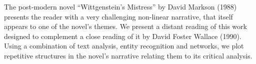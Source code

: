 The post-modern novel ``Wittgenstein's Mistress'' by David Markson (1988) presents the reader with a very challenging non-linear narrative, that itself appears to one of the novel's themes. We present a distant reading of this work designed to complement a close reading of it by David Foster Wallace (1990).   Using a combination of text analysis, entity recognition and networks, we plot repetitive structures in the novel's narrative relating them to its critical analysis.
